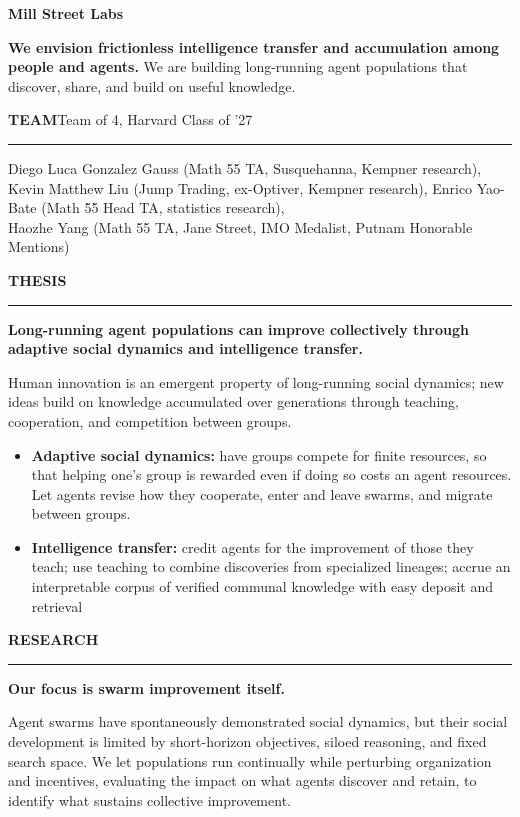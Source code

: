 \documentclass[12pt,letterpaper]{article}
\newcommand{\sect}[2][]{
\par\vspace{8pt}
{\color{accent}\small\bfseries\MakeUppercase{#2}}\hfill{\color{muted}\small#1}\par
\vspace{2pt}\nointerlineskip\vspace{2pt}
{\color{accent!35}\rule{\linewidth}{0.5pt}}
\par\vspace{-1pt}
}
\begin{document}
{\fontsize{26}{28}\selectfont\bfseries\color{accent} Mill Street Labs}\par
\vspace{2pt}{\color{accent}\rule{\linewidth}{1.2pt}}\par
\vspace{4pt}

\textbf{We envision frictionless intelligence transfer and accumulation among people and agents.} We are building long-running agent populations that discover, share, and build on useful knowledge.

\sect[Team of 4, Harvard Class of '27]{Team}
  Diego Luca Gonzalez Gauss (Math 55 TA, Susquehanna, Kempner research), Kevin Matthew Liu (Jump Trading, ex-Optiver, Kempner research), Enrico Yao-Bate (Math 55 Head TA, statistics research), \\ Haozhe Yang (Math 55 TA, Jane Street, IMO Medalist, Putnam Honorable Mentions)

\sect{Thesis}
\textbf{Long-running agent populations can improve collectively through adaptive social dynamics and intelligence transfer.}

Human innovation is an emergent property of long-running social dynamics; new ideas build on knowledge accumulated over generations through teaching, cooperation, and competition between groups.

\begin{itemize}
  \item \textbf{Adaptive social dynamics:} have groups compete for finite resources, so that helping one's group is rewarded even if doing so costs an agent resources. Let agents revise how they cooperate, enter and leave swarms, and migrate between groups.
  \item \textbf{Intelligence transfer:} credit agents for the improvement of those they teach; use teaching to combine discoveries from specialized lineages; accrue an interpretable corpus of verified communal knowledge with easy deposit and retrieval
\end{itemize}

\sect{Research} %
\textbf{Our focus is swarm improvement itself.}

Agent swarms have spontaneously demonstrated social dynamics, but their social development is limited by short-horizon objectives, siloed reasoning, and fixed search space.  We let populations run continually while perturbing organization and incentives, evaluating the impact on what agents discover and retain, to identify what sustains collective improvement.
\end{document}
